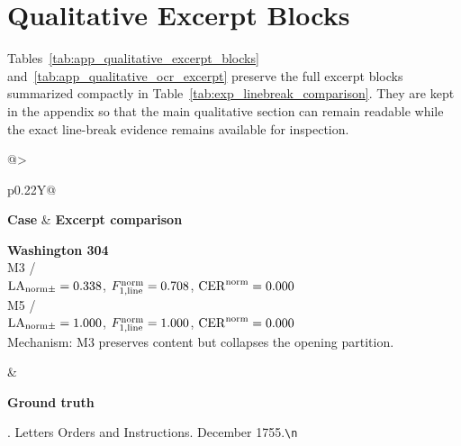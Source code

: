 \FloatBarrier

\section{Qualitative Excerpt Blocks}
\label{sec:appendix_qualitative_excerpts}

Tables~\ref{tab:app_qualitative_excerpt_blocks} and~\ref{tab:app_qualitative_ocr_excerpt} preserve the full excerpt blocks summarized compactly in Table~\ref{tab:exp_linebreak_comparison}. They are kept in the appendix so that the main qualitative section can remain readable while the exact line-break evidence remains available for inspection.

\providecommand{\excerptnl}{\mbox{\texttt{\textbackslash n}}}
\begin{table}[p]
  \centering
  \caption{Full excerpt blocks for three excerpt-backed qualitative cases summarized in Table~\ref{tab:exp_linebreak_comparison}. Metric values in the case column are whitespace-normalized per-sample values, not macro-averages over sample IDs; explicit \texttt{\textbackslash n} markers show true line boundaries, ellipses mark omitted within-line context, and apparent spelling anomalies are reproduced verbatim from the archived transcriptions or predictions rather than silently corrected.}
  \label{tab:app_qualitative_excerpt_blocks}
  \scriptsize
  \renewcommand{\arraystretch}{1.08}
  \setlength{\tabcolsep}{4pt}
  \begin{tabularx}{\linewidth}{@{}>{\raggedright\arraybackslash}p{0.22\linewidth}Y@{}}
    \toprule
    \textbf{Case} & \textbf{Excerpt comparison} \\
    \midrule
    {\raggedright
    \textbf{Washington 304}\\
    M3 / \GPTFiveMarchShort\\
    \(\mathrm{LA}_{\mathrm{norm}\pm}=0.338\), \(F_{1,\mathrm{line}}^{\mathrm{norm}}=0.708\), \(\mathrm{CER}^{\mathrm{norm}}=0.000\)\\
    M5 / \GPTFiveShort\\
    \(\mathrm{LA}_{\mathrm{norm}\pm}=1.000\), \(F_{1,\mathrm{line}}^{\mathrm{norm}}=1.000\), \(\mathrm{CER}^{\mathrm{norm}}=0.000\)\\
    Mechanism: M3 preserves content but collapses the opening partition.\par}
    &
    \begin{minipage}[t]{\hsize}
      \textbf{Ground truth}\par
      {\raggedright{}. Letters Orders and Instructions. December 1755.\excerptnl\\
}
\end{minipage}
\end{tabularx}
\end{table}
